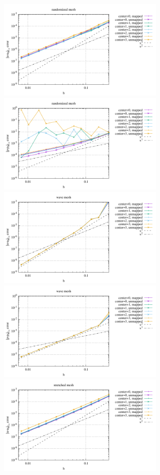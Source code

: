 \begin{center}
\includegraphics[width=8cm]{python_codes/fieldstone_76/results/bench1/curved/errors_V_mt2.pdf}
\includegraphics[width=8cm]{python_codes/fieldstone_76/results/bench1/curved/errors_P_mt2.pdf}\\
\includegraphics[width=8cm]{python_codes/fieldstone_76/results/bench1/curved/errors_V_mt3.pdf}
\includegraphics[width=8cm]{python_codes/fieldstone_76/results/bench1/curved/errors_P_mt3.pdf}\\
\includegraphics[width=8cm]{python_codes/fieldstone_76/results/bench1/curved/errors_V_mt4.pdf}

\end{center}

